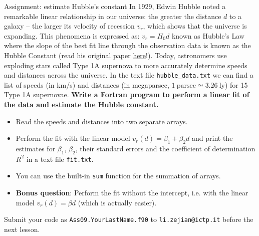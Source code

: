 \documentclass[10pt,aspectratio=169,handout]{beamer}
\begin{document}
\begin{frame}{Assignment: estimate Hubble's constant}
	In 1929, Edwin Hubble noted a remarkable linear relationship in our universe: the greater the distance $d$ to a galaxy – the larger its velocity of recession $v_r$, which shows that the universe is expanding. This phenomena is expressed as:
	$ v_r = H_0 d $
	known as Hubble’s Law where the slope of the best fit line through the observation data is known as the Hubble Constant (read his original paper \href{https://www.pnas.org/doi/10.1073/pnas.15.3.168}{here}!). Today, astronomers use exploding stars called Type 1A supernova to more accurately determine speeds and distances across the universe. In the text file \texttt{hubble\_data.txt} we can find a list of speeds (in km/s) and distances (in megaparsec, $1~\mathrm{parsec} \simeq 3.26~\mathrm{ly}$) for 15 Type 1A supernovae. \textbf{Write a Fortran program to perform a linear fit of the data and estimate the Hubble constant.}\\ \pause
	\begin{itemize}[<+->]
		\item Read the speeds and distances into two separate arrays.
		\item Perform the fit with the linear model $ v_r(d) = \beta_1+\beta_2 d$ and print the estimates for $\beta_1$, $\beta_2$, their standard errors and the coefficient of determination $R^2$ in a text file \texttt{fit.txt}.
		\item You can use the built-in \texttt{sum} function for the summation of arrays.
		\item 	\textbf{Bonus question}: Perform the fit without the intercept, i.e. with the linear model $v_r(d) = \beta d$ (which is actually easier).
	\end{itemize}
Submit your code as \texttt{Ass09.YourLastName.f90} to \texttt{li.zejian@ictp.it} before the next lesson.
\end{frame}

\end{document}
